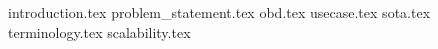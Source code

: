{introduction.tex}
{problem_statement.tex}
{obd.tex}
{usecase.tex}
{sota.tex}
{terminology.tex}
{scalability.tex}
